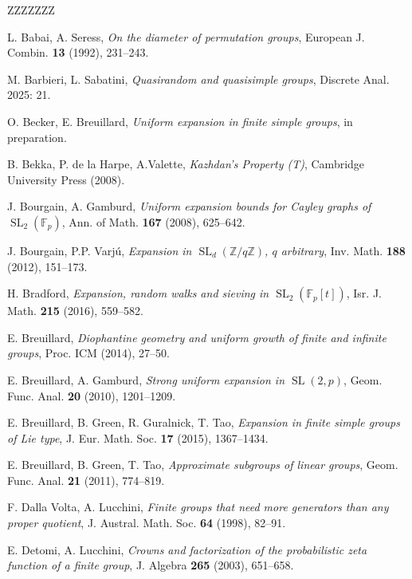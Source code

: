 \documentclass[11pt,reqno]{amsart}
\numberwithin{equation}{section}
\theoremstyle{definition}
\theoremstyle{remark}
\newcommand{\SL}{\mathop{\mathrm{SL}}}
\begin{document}
\vspace{0.1cm}
\begin{thebibliography}{ZZZZZZZ} 

 L. Babai, A. Seress,
\textit{On the diameter of permutation groups},
European J. Combin. \textbf{13} (1992), 231--243.

 M. Barbieri, L. Sabatini,
\textit{Quasirandom and quasisimple groups},
Discrete Anal. 2025: 21.

 O. Becker, E. Breuillard,
\textit{Uniform expansion in finite simple groups},
in preparation.

 B. Bekka, P. de la Harpe, A.Valette,
\textit{Kazhdan's Property (T)},
Cambridge University Press (2008).

 J. Bourgain, A. Gamburd,
\textit{Uniform expansion bounds for Cayley graphs of $\SL_2(\mathbb{F}_p)$},
Ann. of Math. \textbf{167} (2008), 625--642.

 J. Bourgain, P.P. Varj\'u,
\textit{Expansion in $\SL_d(\mathbb{Z}/q\mathbb{Z})$, $q$ arbitrary},
Inv. Math. \textbf{188} (2012), 151--173.

 H. Bradford,
\textit{Expansion, random walks and sieving in $\SL_2(\mathbb{F}_p[t])$},
Isr. J. Math. \textbf{215} (2016), 559--582.

 E. Breuillard,
\textit{Diophantine geometry and uniform growth of finite and infinite groups},
Proc. ICM (2014), 27--50.

 E. Breuillard, A. Gamburd,
\textit{Strong uniform expansion in $\SL(2,p)$},
Geom. Func. Anal. \textbf{20} (2010), 1201--1209.

 E. Breuillard, B. Green, R. Guralnick, T. Tao,
\textit{Expansion in finite simple groups of Lie type},
J. Eur. Math. Soc. \textbf{17} (2015), 1367--1434.

 E. Breuillard, B. Green, T. Tao,
\textit{Approximate subgroups of linear groups},
Geom. Func. Anal. \textbf{21} (2011), 774--819.

 F. Dalla Volta, A. Lucchini,
\textit{Finite groups that need more generators than any proper quotient},
J. Austral. Math. Soc. \textbf{64} (1998), 82--91.

 E. Detomi, A. Lucchini,
\textit{Crowns and factorization of the probabilistic zeta function of a finite group},
J. Algebra \textbf{265} (2003), 651--658.


\end{thebibliography}
\end{document}
